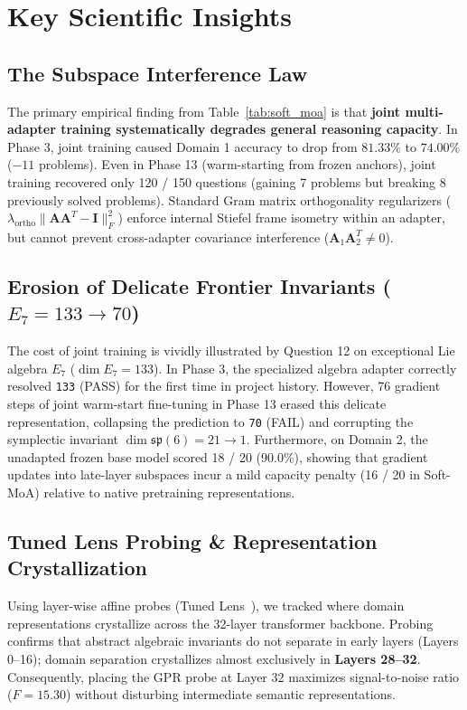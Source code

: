 \documentclass[11pt,a4paper]{article}
\begin{document}
\section{Key Scientific Insights}

\subsection{The Subspace Interference Law}

The primary empirical finding from Table~\ref{tab:soft_moa} is that \textbf{joint multi-adapter training systematically degrades general reasoning capacity}. In Phase 3, joint training caused Domain 1 accuracy to drop from $81.33\%$ to $74.00\%$ ($-11$ problems). Even in Phase 13 (warm-starting from frozen anchors), joint training recovered only 120 / 150 questions (gaining 7 problems but breaking 8 previously solved problems). Standard Gram matrix orthogonality regularizers ($\lambda_{\text{ortho}} \| \mathbf{A}\mathbf{A}^T - \mathbf{I} \|_F^2$) enforce internal Stiefel frame isometry within an adapter, but cannot prevent cross-adapter covariance interference ($\mathbf{A}_1 \mathbf{A}_2^T \neq 0$).

\subsection{Erosion of Delicate Frontier Invariants ($E_7 = 133 \to 70$)}

The cost of joint training is vividly illustrated by Question 12 on exceptional Lie algebra $E_7$ ($\dim E_7 = 133$). In Phase 3, the specialized algebra adapter correctly resolved \texttt{133} (PASS) for the first time in project history. However, 76 gradient steps of joint warm-start fine-tuning in Phase 13 erased this delicate representation, collapsing the prediction to \texttt{70} (FAIL) and corrupting the symplectic invariant $\dim \mathfrak{sp}(6) = 21 \to 1$. Furthermore, on Domain 2, the unadapted frozen base model scored 18 / 20 (90.0\%), showing that gradient updates into late-layer subspaces incur a mild capacity penalty (16 / 20 in Soft-MoA) relative to native pretraining representations.

\subsection{Tuned Lens Probing \& Representation Crystallization}

Using layer-wise affine probes (Tuned Lens~\cite{belrose2023tunedlens}), we tracked where domain representations crystallize across the 32-layer transformer backbone. Probing confirms that abstract algebraic invariants do not separate in early layers (Layers 0--16); domain separation crystallizes almost exclusively in \textbf{Layers 28--32}. Consequently, placing the GPR probe at Layer 32 maximizes signal-to-noise ratio ($F = 15.30$) without disturbing intermediate semantic representations.
\end{document}
